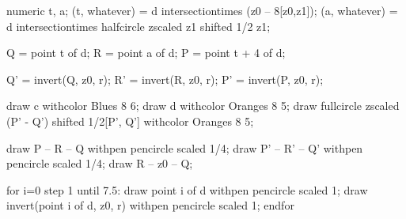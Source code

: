 \documentclass[a4paper]{scrartcl}
\begin{document}
numeric t, a; 
(t, whatever) = d intersectiontimes (z0 -- 8[z0,z1]);
(a, whatever) = d intersectiontimes halfcircle zscaled z1 shifted 1/2 z1;

Q = point t of d;
R = point a of d;
P = point t + 4 of d;

Q' = invert(Q, z0, r);
R' = invert(R, z0, r);
P' = invert(P, z0, r);

draw c withcolor Blues 8 6;
draw d withcolor Oranges 8 5;
draw fullcircle zscaled (P' - Q') shifted 1/2[P', Q'] withcolor Oranges 8 5;

draw P -- R -- Q withpen pencircle scaled 1/4;
draw P' -- R' -- Q' withpen pencircle scaled 1/4;
draw R -- z0 -- Q;

for i=0 step 1 until 7.5:
    draw point i of d withpen pencircle scaled 1;
    draw invert(point i of d, z0, r) withpen pencircle scaled 1;
endfor
\end{document}
